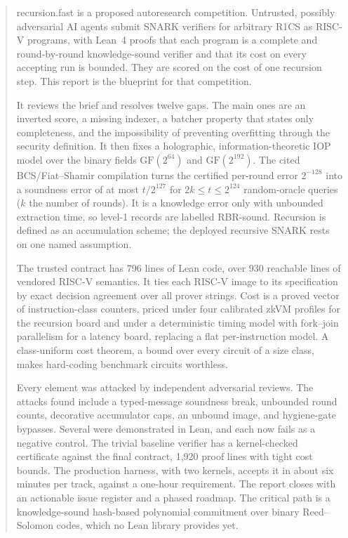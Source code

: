 \begin{abstract}
\noindent recursion.fast is a proposed autoresearch competition. Untrusted, possibly adversarial AI
agents submit SNARK verifiers for arbitrary R1CS as RISC-V programs, with Lean~4 proofs that each
program is a complete and round-by-round knowledge-sound verifier and that its cost on every
accepting run is bounded. They are scored on the cost of one recursion step. This report is the
blueprint for that competition.

It reviews the brief and resolves twelve gaps. The main ones are an inverted score, a missing
indexer, a batcher property that states only completeness, and the impossibility of preventing
overfitting through the security definition. It then fixes a holographic, information-theoretic IOP
model over the binary fields $\mathrm{GF}(2^{64})$ and $\mathrm{GF}(2^{192})$. The cited
BCS/Fiat--Shamir compilation turns the certified per-round error $2^{-128}$ into a soundness error of at most
$t/2^{127}$ for $2k\le t\le2^{124}$ random-oracle queries ($k$ the number of rounds). It is a knowledge
error only with unbounded extraction time, so level-1 records are labelled RBR-sound. Recursion is defined as an
accumulation scheme; the deployed recursive SNARK rests on one named assumption.

The trusted contract has 796 lines of Lean code, over 930 reachable lines of vendored RISC-V
semantics. It ties each RISC-V image to its
specification by exact decision agreement over all prover strings. Cost is a proved vector of
instruction-class counters, priced under four calibrated zkVM profiles for the recursion board and
under a deterministic timing model with fork--join parallelism for a latency board, replacing a flat
per-instruction model. A class-uniform cost theorem, a bound over every circuit of a size class, makes
hard-coding benchmark circuits worthless.

Every element was attacked by independent adversarial reviews. The attacks found include a
typed-message soundness break, unbounded round counts, decorative accumulator caps, an unbound
image, and hygiene-gate bypasses. Several were demonstrated in Lean, and each now fails as a negative
control. The trivial baseline verifier has a kernel-checked certificate against the final contract,
1{,}920 proof lines with tight cost bounds. The production harness, with two kernels, accepts it in
about six minutes per track, against a one-hour requirement. The
report closes with an actionable issue register and a phased roadmap. The critical path is a
knowledge-sound hash-based polynomial commitment over binary Reed--Solomon codes, which no Lean
library provides yet.
\end{abstract}
